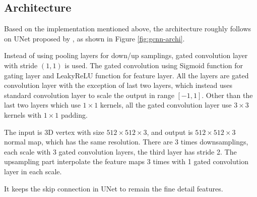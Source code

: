 
\subsection{Architecture}
\label{sec:architecture}
Based on the implementation mentioned above, the architecture roughly follows on UNet proposed by \cite{unet}, as shown in Figure \ref{fig:gcnn-archi}. 

Instead of using pooling layers for down/up samplings, gated convolution layer with stride $ (1,1) $ is used. The gated convolution using Sigmoid function for gating layer and LeakyReLU function for feature layer. All the layers are gated convolution layer with the exception of last two layers, which instead uses standard convolution layer to scale the output in range $\left[-1, 1\right]$. Other than the last two layers which use $ 1\times 1 $ kernels, all the gated convolution layer use $ 3\times 3 $ kernels with $ 1\times1 $ padding. 

The input is 3D vertex with size $ 512\times512\times3 $, and output is $ 512\times512\times3 $ normal map, which has the same resolution. There are 3 times downsamplings, each scale with 3 gated convolution layers, the third layer has stride 2. The upsampling part interpolate the feature maps 3 times with 1 gated convolution layer in each scale. 

It keeps the skip connection in UNet to remain the fine detail features. 
 
